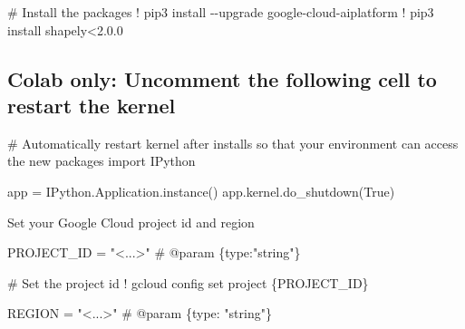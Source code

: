 \documentclass[
  letterpaper,
  DIV=11,
  numbers=noendperiod]{scrreprt}
\newenvironment{Shaded}{\begin{snugshade}}{\end{snugshade}}
\newcommand{\BuiltInTok}[1]{\textcolor[rgb]{0.00,0.23,0.31}{#1}}
\newcommand{\CommentTok}[1]{\textcolor[rgb]{0.37,0.37,0.37}{#1}}
\newcommand{\FloatTok}[1]{\textcolor[rgb]{0.68,0.00,0.00}{#1}}
\newcommand{\ImportTok}[1]{\textcolor[rgb]{0.00,0.46,0.62}{#1}}
\newcommand{\NormalTok}[1]{\textcolor[rgb]{0.00,0.23,0.31}{#1}}
\newcommand{\OperatorTok}[1]{\textcolor[rgb]{0.37,0.37,0.37}{#1}}
\newcommand{\StringTok}[1]{\textcolor[rgb]{0.13,0.47,0.30}{#1}}
\newcommand{\VariableTok}[1]{\textcolor[rgb]{0.07,0.07,0.07}{#1}}
\begin{document}
\begin{Shaded}
\begin{Highlighting}[]
\CommentTok{\# Install the packages}
\OperatorTok{!}\NormalTok{ pip3 install }\OperatorTok{{-}{-}}\NormalTok{upgrade google}\OperatorTok{{-}}\NormalTok{cloud}\OperatorTok{{-}}\NormalTok{aiplatform}
\OperatorTok{!}\NormalTok{ pip3 install shapely}\OperatorTok{\textless{}}\FloatTok{2.0.0}
\end{Highlighting}
\end{Shaded}

\hypertarget{colab-only-uncomment-the-following-cell-to-restart-the-kernel}{%
\subsection{Colab only: Uncomment the following cell to restart the
kernel}\label{colab-only-uncomment-the-following-cell-to-restart-the-kernel}}

\begin{Shaded}
\begin{Highlighting}[]
\CommentTok{\# Automatically restart kernel after installs so that your environment can access the new packages}
\ImportTok{import}\NormalTok{ IPython}

\NormalTok{app }\OperatorTok{=}\NormalTok{ IPython.Application.instance()}
\NormalTok{app.kernel.do\_shutdown(}\VariableTok{True}\NormalTok{)}
\end{Highlighting}
\end{Shaded}

Set your Google Cloud project id and region

\begin{Shaded}
\begin{Highlighting}[]
\NormalTok{PROJECT\_ID }\OperatorTok{=} \StringTok{"\textless{}...\textgreater{}"}  \CommentTok{\# @param \{type:"string"\}}

\CommentTok{\# Set the project id}
\OperatorTok{!}\NormalTok{ gcloud config }\BuiltInTok{set}\NormalTok{ project \{PROJECT\_ID\}}
\end{Highlighting}
\end{Shaded}

\begin{Shaded}
\begin{Highlighting}[]
\NormalTok{REGION }\OperatorTok{=} \StringTok{"\textless{}...\textgreater{}"}  \CommentTok{\# @param \{type: "string"\}}
\end{Highlighting}
\end{Shaded}
\end{document}
